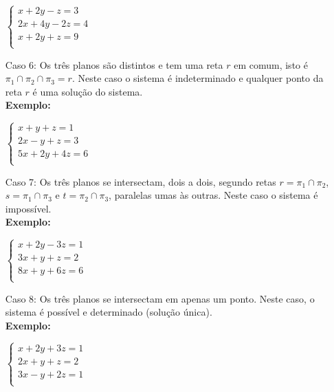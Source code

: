 \documentclass[oneside,a4paper,12pt]{article}
\begin{document}
\begin{enumerate}
	$
	\left\{
	\begin{array}{c}
	x + 2y - z = 3 \\
	2x+ 4y - 2z = 4 \\
	x+ 2y + z = 9 \\
	\end{array}
	\right.
	$
	
	\item [Caso 6:] Os três planos são distintos e tem uma reta $r$ em comum, isto é $\pi_1 \cap \pi_2 \cap \pi_3 = r$. Neste caso o sistema é indeterminado e qualquer ponto da reta $r$ é uma solução do sistema. \\
	\textbf{Exemplo: }
	
	$
	\left\{
	\begin{array}{c}
	x + y + z = 1 \\
	2x- y + z = 3 \\
	5x+ 2y + 4z = 6 \\
	\end{array}
	\right.
	$
	
	\item [Caso 7:] Os três planos se intersectam, dois a dois, segundo retas $r = \pi_1 \cap \pi_2$, $s = \pi_1 \cap \pi_3$ e $t = \pi_2 \cap \pi_3$, paralelas umas às outras. Neste caso o sistema é impossível. \\
	\textbf{Exemplo: }

	$
	\left\{
	\begin{array}{c}
	x + 2y - 3z = 1 \\
	3x+ y + z = 2 \\
	8x+ y + 6z = 6 \\
	\end{array}
	\right.
	$	
	
	\item [Caso 8:] Os três planos se intersectam em apenas um ponto. Neste caso, o sistema é possível e determinado (solução única). \\
	\textbf{Exemplo: }

	$
	\left\{
	\begin{array}{c}
	x + 2y + 3z = 1 \\
	2x+ y + z = 2 \\
	3x- y + 2z = 1 \\
	\end{array}
	\right.
	$	
	
\end{enumerate}
\end{document}
